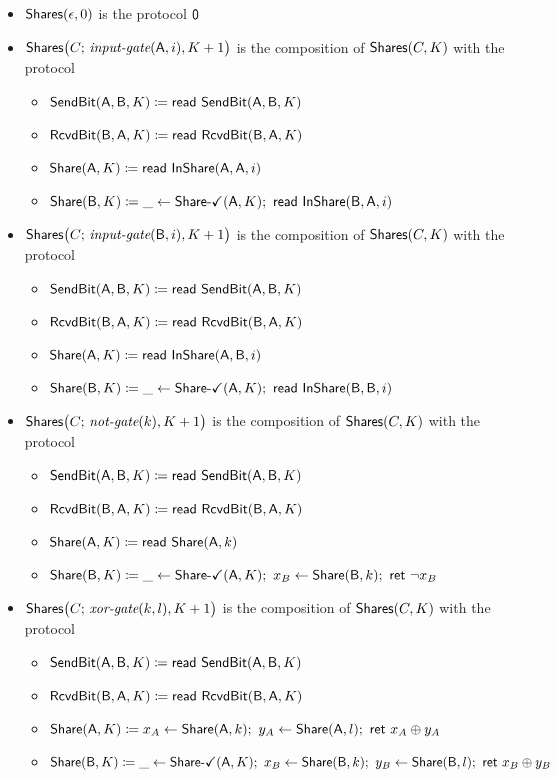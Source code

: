 \begin{itemize}
\item $\Shares(\epsilon,0)$ is the protocol $\zero$

\item $\Shares\big(C; \, \inputgate(\A,i),K+1\big)$ is the composition of $\Shares(C,K)$ with the protocol
\begin{itemize}
\item $\SendBit(\A,\B,K) \coloneqq \read{\SendBit(\A,\B,K)}$
\item $\RcvdBit(\B,\A,K) \coloneqq \read{\RcvdBit(\B,\A,K)}$
\item $\Share(\A,K) \coloneqq \read{\InShare(\A,\A,i)}$
\item $\Share(\B,K) \coloneqq \_ \leftarrow \ShareOk(\A,K); \ \read{\InShare(\B,\A,i)}$
\end{itemize}

\item $\Shares\big(C; \, \inputgate(\B,i),K+1\big)$ is the composition of $\Shares(C,K)$ with the protocol
\begin{itemize}
\item $\SendBit(\A,\B,K) \coloneqq \read{\SendBit(\A,\B,K)}$
\item $\RcvdBit(\B,\A,K) \coloneqq \read{\RcvdBit(\B,\A,K)}$
\item $\Share(\A,K) \coloneqq \read{\InShare(\A,\B,i)}$
\item $\Share(\B,K) \coloneqq \_ \leftarrow \ShareOk(\A,K); \ \read{\InShare(\B,\B,i)}$
\end{itemize}

\item $\Shares\big(C; \, \notgate(k),K+1\big)$ is the composition of $\Shares(C,K)$ with the protocol
\begin{itemize}
\item $\SendBit(\A,\B,K) \coloneqq \read{\SendBit(\A,\B,K)}$
\item $\RcvdBit(\B,\A,K) \coloneqq \read{\RcvdBit(\B,\A,K)}$
\item $\Share(\A,K) \coloneqq \read{\Share(\A,k)}$
\item $\Share(\B,K) \coloneqq \_ \leftarrow \ShareOk(\A,K); \ x_B \leftarrow \Share(\B,k); \ \ret{\neg x_B}$
\end{itemize}

\item $\Shares\big(C; \, \xorgate(k,l),K+1\big)$ is the composition of $\Shares(C,K)$ with the protocol
\begin{itemize}
\item $\SendBit(\A,\B,K) \coloneqq \read{\SendBit(\A,\B,K)}$
\item $\RcvdBit(\B,\A,K) \coloneqq \read{\RcvdBit(\B,\A,K)}$
\item $\Share(\A,K) \coloneqq x_A \leftarrow \Share(\A,k); \ y_A \leftarrow \Share(\A,l); \ \ret{x_A \oplus y_A}$
\item $\Share(\B,K) \coloneqq \_ \leftarrow \ShareOk(\A,K); \ x_B \leftarrow \Share(\B,k); \ y_B \leftarrow \Share(\B,l); \ \ret{x_B \oplus y_B}$
\end{itemize}


\end{itemize}
